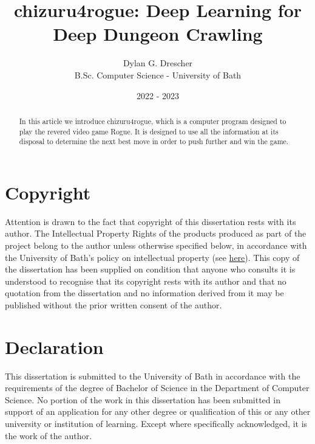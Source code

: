 \documentclass[11pt,a4paper]{article}
\begin{document}
\title{chizuru4rogue: Deep Learning for Deep Dungeon Crawling}
\author{Dylan G. Drescher \\[1ex] B.Sc. Computer Science - University of Bath}
\date{2022 - 2023}
\maketitle

\begin{abstract}
    In this article we introduce chizuru4rogue, which is a computer program designed to play the revered video game Rogue. It is designed to use all the information at its disposal to determine the next best move in order to push further and win the game.
\end{abstract}

\setcounter{page}{0}
\thispagestyle{empty}

\newpage


\section*{Copyright}
Attention is drawn to the fact that copyright of this dissertation rests with its author. The Intellectual Property Rights of the products produced as part of the project belong to the author unless otherwise specified below, in accordance with the University of Bath's policy on intellectual property (see \href{https://www.bath.ac.uk/publications/university-ordinances/attachments/Ordinances_1_October_2020.pdf}{here}). This copy of the dissertation has been supplied on condition that anyone who consults it is understood to recognise that its copyright rests with its author and that no quotation from the dissertation and no information derived from it may be published without the prior written consent of the author.

\section*{Declaration}
This dissertation is submitted to the University of Bath in accordance with the requirements of the degree of Bachelor of Science in the Department of Computer Science. No portion of the work in this dissertation has been submitted in support of an application for any other degree or qualification of this or any other university or institution of learning. Except where specifically acknowledged, it is the work of the author.
\end{document}

